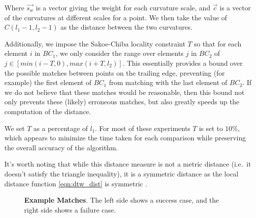 Where $\vec{s_w}$ is a vector giving the weight for each curvature scale, and $\vec{c}$ is a vector of the curvatures at different scales for a point.
We then take the value of $C(l_1-1, l_2-1)$ as the distance between the two curvatures.

Additionally, we impose the Sakoe-Chiba \cite{sakoe1978dynamic} locality constraint $T$ so that for each element $i$ in $BC_1$, we only consider the range over elements $j$ in $BC_2$ of $j \in [min(i - T, 0), max(i + T, l_2)]$.
This essentially provides a bound over the possible matches between points on the trailing edge, preventing (for example) the first element of $BC_1$ from matching with the last element of $BC_2$.
If we do not believe that these matches would be reasonable, then this bound not only prevents these (likely) erroneous matches, but also greatly speeds up the computation of the distance.

We set $T$ as a percentage of $l_1$.
For most of these experiments $T$ is set to $10\%$, which appears to minimize the time taken for each comparison while preserving the overall accuracy of the algorithm.

It's worth noting that while this distance measure is not a metric distance (i.e.\ it doesn't satisfy the triangle inequality), it is a symmetric distance as the local distance function \eqref{eqn:dtw_dist} is symmetric \cite{muller2007information}.



\begin{figure}[t]%
\centering
{}
\newline
{}
\newline
{}
\newline
{}
\newline
{}
\newline
{}
\caption[]{\textbf{Example Matches}. The left side shows a success case, and the right side shows a failure case.} 
\label{fig:example_match}
\end{figure}

